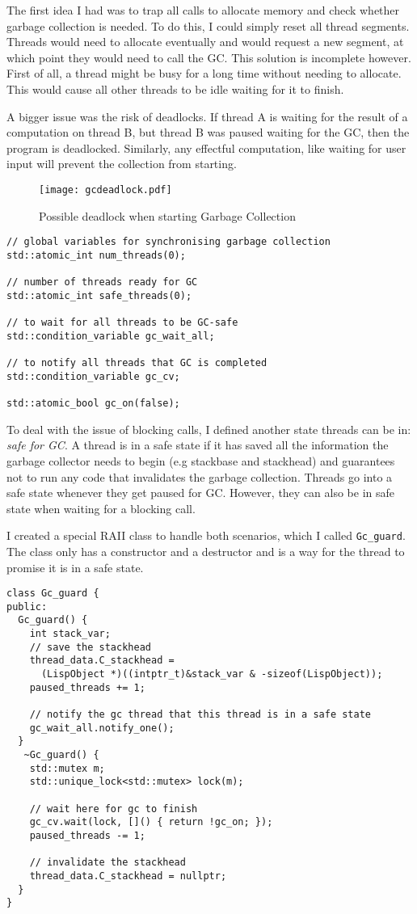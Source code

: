 The first idea I had was to trap all calls to allocate memory and check whether garbage collection is needed.
To do this, I could simply reset all thread segments. Threads would need to allocate eventually and
would request a new segment, at which point they would need to call the GC. This solution is incomplete however.
First of all, a thread might be busy for a long time without needing to allocate. This would cause all other
threads to be idle waiting for it to finish.

A bigger issue was the risk of deadlocks. If thread A is waiting for the result of a computation on thread B,
but thread B was paused waiting for the GC, then the program is deadlocked. Similarly, any effectful computation,
like waiting for user input will prevent the collection from starting.

\begin{figure}[H]
  \centering
  \texttt{[image: gcdeadlock.pdf]}
  \label{fig:gcdeadlock}
  \caption{Possible deadlock when starting Garbage Collection}
\end{figure}

\begin{verbatim}
// global variables for synchronising garbage collection
std::atomic_int num_threads(0);

// number of threads ready for GC
std::atomic_int safe_threads(0);

// to wait for all threads to be GC-safe
std::condition_variable gc_wait_all;

// to notify all threads that GC is completed
std::condition_variable gc_cv;

std::atomic_bool gc_on(false);
\end{verbatim}

To deal with the issue of blocking calls, I defined another state threads can be in: \emph{safe for GC}. A thread
is in a safe state if it has saved all the information the garbage collector needs to begin (e.g stackbase
and stackhead) and guarantees not to run any code that invalidates the garbage collection. Threads go into a safe
state whenever they get paused for GC. However, they can also be in safe state when waiting for a blocking call.

I created a special RAII class to handle both scenarios, which I called \texttt{Gc\_guard}. The class only has a constructor
and a destructor and is a way for the thread to promise it is in a safe state.

\begin{verbatim}
class Gc_guard {
public:
  Gc_guard() {
    int stack_var;
    // save the stackhead
    thread_data.C_stackhead =
      (LispObject *)((intptr_t)&stack_var & -sizeof(LispObject));
    paused_threads += 1;

    // notify the gc thread that this thread is in a safe state
    gc_wait_all.notify_one();
  }
   ~Gc_guard() {
    std::mutex m;
    std::unique_lock<std::mutex> lock(m);

    // wait here for gc to finish
    gc_cv.wait(lock, []() { return !gc_on; });
    paused_threads -= 1;

    // invalidate the stackhead
    thread_data.C_stackhead = nullptr;
  }
}
\end{verbatim}

